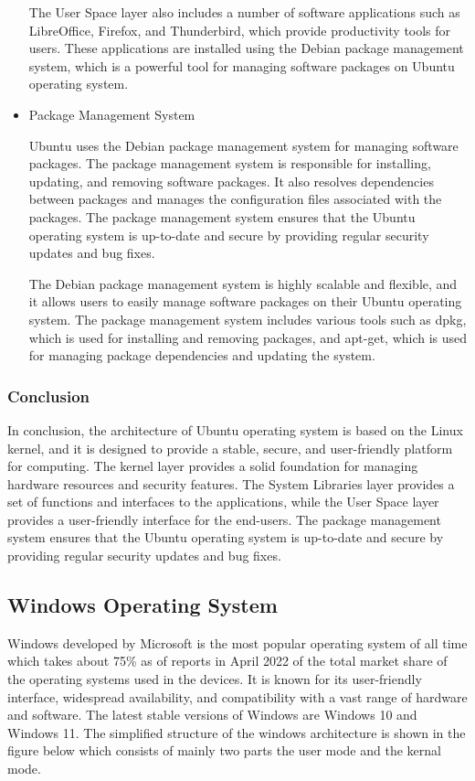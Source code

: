 \documentclass[conference]{IEEEtran}
\begin{document}
\begin{itemize}
    The User Space layer also includes a number of software applications such as LibreOffice, Firefox, and Thunderbird, which provide productivity tools for users. These applications are installed using the Debian package management system, which is a powerful tool for managing software packages on Ubuntu operating system.
    \linebreak
    \item  Package Management System

    Ubuntu uses the Debian package management system for managing software packages. The package management system is responsible for installing, updating, and removing software packages. It also resolves dependencies between packages and manages the configuration files associated with the packages. The package management system ensures that the Ubuntu operating system is up-to-date and secure by providing regular security updates and bug fixes.

    The Debian package management system is highly scalable and flexible, and it allows users to easily manage software packages on their Ubuntu operating system. The package management system includes various tools such as dpkg, which is used for installing and removing packages, and apt-get, which is used for managing package dependencies and updating the system.

\end{itemize}
\subsubsection*{Conclusion}
In conclusion, the architecture of Ubuntu operating system is based on the Linux kernel, and it is designed to provide a stable, secure, and user-friendly platform for computing. The kernel layer provides a solid foundation for managing hardware resources and security features. The System Libraries layer provides a set of functions and interfaces to the applications, while the User Space layer provides a user-friendly interface for the end-users. The package management system ensures that the Ubuntu operating system is up-to-date and secure by providing regular security updates and bug fixes.

\subsection{Windows Operating System}
Windows developed by Microsoft is the most popular operating system of all time which takes about 75\% as of reports in April 2022 of the total market share of the operating systems used in the devices. It is known for its user-friendly interface, widespread availability, and compatibility with a vast range of hardware and software. The latest stable versions of Windows are Windows 10 and Windows 11. The simplified structure of the windows architecture is shown in the figure below which consists of mainly two parts the user mode and the kernal mode.
\end{document}
